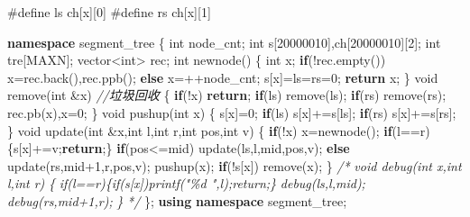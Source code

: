 \documentclass[
]{article}
\newenvironment{Shaded}{}{}
\newcommand{\CommentTok}[1]{\textcolor[rgb]{0.38,0.63,0.69}{\textit{#1}}}
\newcommand{\ControlFlowTok}[1]{\textcolor[rgb]{0.00,0.44,0.13}{\textbf{#1}}}
\newcommand{\DataTypeTok}[1]{\textcolor[rgb]{0.56,0.13,0.00}{#1}}
\newcommand{\DecValTok}[1]{\textcolor[rgb]{0.25,0.63,0.44}{#1}}
\newcommand{\KeywordTok}[1]{\textcolor[rgb]{0.00,0.44,0.13}{\textbf{#1}}}
\newcommand{\NormalTok}[1]{#1}
\newcommand{\PreprocessorTok}[1]{\textcolor[rgb]{0.74,0.48,0.00}{#1}}
\begin{document}
\begin{Shaded}
\begin{Highlighting}[]
\PreprocessorTok{\#define ls }\NormalTok{ch[x][}\DecValTok{0}\NormalTok{]}
\PreprocessorTok{\#define rs }\NormalTok{ch[x][}\DecValTok{1}\NormalTok{]}

\KeywordTok{namespace}\NormalTok{ segment\_tree}
\NormalTok{\{}
    \DataTypeTok{int}\NormalTok{ node\_cnt;}
    \DataTypeTok{int}\NormalTok{ s[}\DecValTok{20000010}\NormalTok{],ch[}\DecValTok{20000010}\NormalTok{][}\DecValTok{2}\NormalTok{];}
    \DataTypeTok{int}\NormalTok{ tre[MAXN];}
\NormalTok{    vector\textless{}}\DataTypeTok{int}\NormalTok{\textgreater{} rec;}
    \DataTypeTok{int}\NormalTok{ newnode()}
\NormalTok{    \{}
        \DataTypeTok{int}\NormalTok{ x;}
        \ControlFlowTok{if}\NormalTok{(!rec.empty()) x=rec.back(),rec.ppb();}
        \ControlFlowTok{else}\NormalTok{ x=++node\_cnt;}
\NormalTok{        s[x]=ls=rs=}\DecValTok{0}\NormalTok{;}
        \ControlFlowTok{return}\NormalTok{ x;}
\NormalTok{    \}}
    \DataTypeTok{void}\NormalTok{ remove(}\DataTypeTok{int}\NormalTok{ \&x) }\CommentTok{//垃圾回收}
\NormalTok{    \{}
        \ControlFlowTok{if}\NormalTok{(!x) }\ControlFlowTok{return}\NormalTok{;}
        \ControlFlowTok{if}\NormalTok{(ls) remove(ls);}
        \ControlFlowTok{if}\NormalTok{(rs) remove(rs);}
\NormalTok{        rec.pb(x),x=}\DecValTok{0}\NormalTok{;}
\NormalTok{    \}}
    \DataTypeTok{void}\NormalTok{ pushup(}\DataTypeTok{int}\NormalTok{ x)}
\NormalTok{    \{}
\NormalTok{        s[x]=}\DecValTok{0}\NormalTok{;}
        \ControlFlowTok{if}\NormalTok{(ls) s[x]+=s[ls];}
        \ControlFlowTok{if}\NormalTok{(rs) s[x]+=s[rs];}
\NormalTok{    \}}
    \DataTypeTok{void}\NormalTok{ update(}\DataTypeTok{int}\NormalTok{ \&x,}\DataTypeTok{int}\NormalTok{ l,}\DataTypeTok{int}\NormalTok{ r,}\DataTypeTok{int}\NormalTok{ pos,}\DataTypeTok{int}\NormalTok{ v)}
\NormalTok{    \{}
        \ControlFlowTok{if}\NormalTok{(!x) x=newnode();}
        \ControlFlowTok{if}\NormalTok{(l==r)\{s[x]+=v;}\ControlFlowTok{return}\NormalTok{;\}}
        \ControlFlowTok{if}\NormalTok{(pos\textless{}=mid) update(ls,l,mid,pos,v);}
        \ControlFlowTok{else}\NormalTok{ update(rs,mid+}\DecValTok{1}\NormalTok{,r,pos,v);}
\NormalTok{        pushup(x); }\ControlFlowTok{if}\NormalTok{(!s[x]) remove(x);}
\NormalTok{    \}}
\CommentTok{/*}
\CommentTok{    void debug(int x,int l,int r)}
\CommentTok{    \{}
\CommentTok{        if(l==r)\{if(s[x])printf("\%d ",l);return;\}}
\CommentTok{        debug(ls,l,mid);}
\CommentTok{        debug(rs,mid+1,r);}
\CommentTok{    \}}
\CommentTok{*/}
\NormalTok{\};}
\KeywordTok{using} \KeywordTok{namespace}\NormalTok{ segment\_tree;}


\end{Highlighting}
\end{Shaded}
\end{document}
